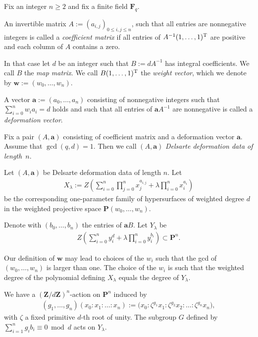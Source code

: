 \documentclass[11pt]{article}
\numberwithin{equation}{section}
\begin{document}
Fix an integer $n\geq 2$ and f\/ix a f\/inite f\/ield $\mathbf{F}_q$.
\begin{Definition}An invertible matrix $A:=(a_{i,j})_{0\leq i,j\leq n}$, such that all entries are nonnegative integers is called a \emph{coefficient matrix} if all entries of $A^{-1}(1,\dots,1)^{\rm T}$ are positive and each column of $A$ contains a zero.

In that case let $d$ be an integer such that $B:=dA^{-1}$ has integral coef\/f\/icients. We call $B$ the \emph{map matrix}. We call $B(1,\dots,1)^{\rm T}$ the \emph{weight vector}, which we denote by $\mathbf{w}:=(w_0,\dots,w_n)$.

A vector $\mathbf{a}:=(a_0,\dots,a_n)$ consisting of nonnegative integers such that $\sum\limits_{i=0}^n w_ia_i=d$ holds and such that all entries of $\mathbf{a} A^{-1} $ are nonnegative is called a \emph{deformation vector}.
\end{Definition}

\begin{Definition} Fix a pair $(A,\mathbf{a})$ consisting of coef\/f\/icient matrix and a deformation vector $\mathbf{a}$. Assume that $\gcd(q,d)=1$. Then we call $(A,\mathbf{a})$ \emph{Delsarte deformation data of length~$n$}.
\end{Definition}

Let $(A,\mathbf{a})$ be Delsarte deformation data of length $n$. Let
\begin{gather*} X_\lambda:=Z\left( \sum_{i=0}^n \prod_{j=0}^n x_j^{a_{i,j}} + \lambda \prod_{i=0}^n x_i^{a_i}\right)\end{gather*}
be the corresponding one-parameter family of hypersurfaces of weighted degree $d$ in the weighted projective space $\mathbf{P}(w_0,\dots,w_n)$.

Denote with $(b_0,\dots,b_n)$ the entries of $\mathbf{a} B $. Let $Y_{\lambda}$ be
\begin{gather*} Z\left(\sum_{i=0}^n y_i^d +\lambda \prod_{i=0}^n y_i^{b_i}\right) \subset \mathbf{P}^n.\end{gather*}

\begin{Remark} Our def\/inition of $\mathbf{w}$ may lead to choices of the $w_i$ such that the gcd of $(w_0,\dots,w_n)$ is larger than one. The choice of the $w_i$ is such that the weighted degree of the polynomial def\/ining $X_{\lambda}$ equals the degree of $Y_\lambda$.
\end{Remark}

We have a $(\mathbf{Z}/d\mathbf{Z})^{n}$-action on $\mathbf{P}^n$ induced by
\begin{gather*} (g_1,\dots,g_n)(x_0:x_1:\dots:x_n):=\big(x_0:\zeta^{g_1}x_1:\zeta^{g_2}x_2:\dots:\zeta^{g_n}x_n\big),\end{gather*}
with $\zeta$ a f\/ixed primitive $d$-th root of unity. The subgroup $G$ def\/ined by $\sum\limits_{i=1}^n g_i b_i\equiv 0 \bmod d$ acts on $Y_{\lambda}$.
\end{document}
